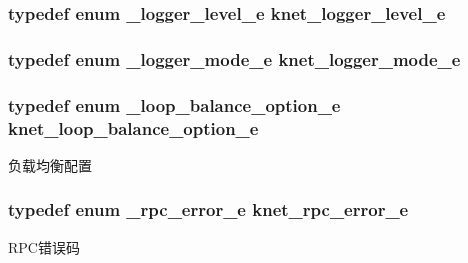 \subsubsection[{knet\+\_\+logger\+\_\+level\+\_\+e}]{\setlength{\rightskip}{0pt plus 5cm}typedef enum {\bf \+\_\+logger\+\_\+level\+\_\+e}  {\bf knet\+\_\+logger\+\_\+level\+\_\+e}}\label{a00054_a8bb61ec2ff976625d0707a81c1ccc149_a8bb61ec2ff976625d0707a81c1ccc149}
\hypertarget{a00054_a3ad8e017e53143bca2ada78d2bfa30e1_a3ad8e017e53143bca2ada78d2bfa30e1}{}
\subsubsection[{knet\+\_\+logger\+\_\+mode\+\_\+e}]{\setlength{\rightskip}{0pt plus 5cm}typedef enum {\bf \+\_\+logger\+\_\+mode\+\_\+e}  {\bf knet\+\_\+logger\+\_\+mode\+\_\+e}}\label{a00054_a3ad8e017e53143bca2ada78d2bfa30e1_a3ad8e017e53143bca2ada78d2bfa30e1}
\hypertarget{a00054_aa131da8fb72468b39b6ee0e2d46b17b2_aa131da8fb72468b39b6ee0e2d46b17b2}{}
\subsubsection[{knet\+\_\+loop\+\_\+balance\+\_\+option\+\_\+e}]{\setlength{\rightskip}{0pt plus 5cm}typedef enum {\bf \+\_\+loop\+\_\+balance\+\_\+option\+\_\+e}  {\bf knet\+\_\+loop\+\_\+balance\+\_\+option\+\_\+e}}\label{a00054_aa131da8fb72468b39b6ee0e2d46b17b2_aa131da8fb72468b39b6ee0e2d46b17b2}
负载均衡配置 \hypertarget{a00054_a09f6be2164ffa374198a4ab2af2e1966_a09f6be2164ffa374198a4ab2af2e1966}{}
\subsubsection[{knet\+\_\+rpc\+\_\+error\+\_\+e}]{\setlength{\rightskip}{0pt plus 5cm}typedef enum {\bf \+\_\+rpc\+\_\+error\+\_\+e}  {\bf knet\+\_\+rpc\+\_\+error\+\_\+e}}\label{a00054_a09f6be2164ffa374198a4ab2af2e1966_a09f6be2164ffa374198a4ab2af2e1966}
R\+P\+C错误码 \hypertarget{a00054_a6fe1ebc0ddea56dd3c337115c1e10bc4_a6fe1ebc0ddea56dd3c337115c1e10bc4}{}
